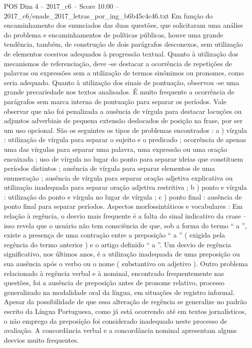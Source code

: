 \begin{textsample}{POS Dim 4 – 2017\_c6 – Score 10.00 – 2017\_c6/enade\_2017\_letras\_por\_ing\_b6b45c4c46.txt}
Em função do encaminhamento dos enunciados das duas questões, que solicitaram uma análise do problema e encaminhamentos de políticas públicas, houve uma grande tendência, também, de construção de dois parágrafos desconexos, sem utilização de elementos coesivos adequados à progressão textual.
Quanto à utilização dos mecanismos de referenciação, deve -se destacar a ocorrência de repetições de palavras ou expressões sem a utilização de termos sinônimos ou pronomes, como seria adequado.
Quanto à utilização dos sinais de pontuação, observou -se uma grande precariedade nos textos analisados.
É muito frequente a ocorrência de parágrafos sem marca interna de pontuação para separar os períodos.
Vale observar que não foi penalizada a ausência de vírgula para destacar locuções ou adjuntos adverbiais de pequena extensão deslocados de posição na frase, por ser um uso opcional.
São os seguintes os tipos de problemas encontrados : a ) vírgula : utilização de vírgula para separar o sujeito e o predicado ; ocorrência de apenas uma das vírgulas para separar uma palavra, uma expressão ou uma oração encaixada ; uso de vírgula no lugar do ponto para separar ideias que constituem períodos distintos ; ausência de vírgula para separar elementos de uma enumeração ; ausência de vírgula para separar oração adjetiva explicativa ou utilização inadequada para separar oração adjetiva restritiva ; b ) ponto e vírgula : utilização do ponto e vírgula no lugar de vírgula ; c ) ponto final : ausência de ponto final para separar períodos.
Aspectos morfossintáticos e vocabulares : Em relação à regência, o desvio mais frequente é a falta do sinal indicativo da crase – isso revela que o usuário não tem consciência de que, sob a forma do termo “ a ”, existe a presença de uma contração entre a preposição “ a ” ( exigida pela regência do termo anterior ) e o artigo definido “ a ”.
Um desvio de regência significativo, nos últimos anos, é a utilização inadequada de uma preposição ou sua ausência após o verbo ou o nome ( substantivo ou adjetivo ).
Outro problema relacionado à regência verbal e à nominal, encontrado frequentemente nas questões, foi a ausência de preposição antes de pronome relativo, processo generalizado na modalidade oral da língua, em situações de registro informal.
Apesar da possibilidade de que essa alteração de regência se generalize no padrão escrito da Língua Portuguesa, como já está ocorrendo até em textos jornalísticos, o não emprego da preposição foi considerado inadequado neste processo de avaliação.
A concordância verbal e a concordância nominal apresentam alguns desvios muito frequentes.

\end{textsample}
